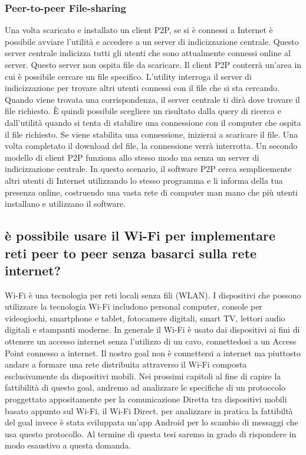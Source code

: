 \subsubsection{Peer-to-peer File-sharing}
Una volta scaricato e installato un client P2P, se si è connessi a Internet è
possibile avviare l'utilità e accedere a un server di indicizzazione centrale.
Questo server centrale indicizza tutti gli utenti che sono attualmente connessi
online al server. Questo server non ospita file da scaricare. Il client P2P
conterrà un'area in cui è possibile cercare un file specifico. L'utility
interroga il server di indicizzazione per trovare altri utenti connessi con il
file che si sta cercando. Quando viene trovata una corrispondenza, il server
centrale ti dirà dove trovare il file richiesto. È quindi possibile scegliere
un risultato dalla query di ricerca e dall'utilità quando si tenta di stabilire
una connessione con il computer che ospita il file richiesto. Se viene
stabilita una connessione, inizierai a scaricare il file. Una volta completato
il download del file, la connessione verrà interrotta.
Un secondo modello di client P2P funziona allo stesso modo ma senza un server
di indicizzazione centrale. In questo scenario, il software P2P cerca
semplicemente altri utenti di Internet utilizzando lo stesso programma e li
informa della tua presenza online, costruendo una vasta rete di computer man
mano che più utenti installano e utilizzano il software.

\subsection{è possibile usare il Wi-Fi per 
implementare reti peer to peer senza basarci sulla rete internet?}

Wi-Fi  è una tecnologia per reti locali senza
fili (WLAN). 
I dispositivi che possono utilizzare la tecnologia Wi-Fi includono 
personal computer, console per videogiochi, smartphone e tablet,
fotocamere digitali, smart TV, lettori audio digitali e stampanti moderne.
In generale il Wi-Fi è usato dai dispositivi 
ai fini di ottenere un accesso internet senza l'utilizzo di un cavo,
connettedosi a un Access Point connesso a internet.
Il nostro goal non è connettersi a internet ma piuttosto andare
a formare una rete distribuita attraverso il Wi-Fi 
composta esclusivamente da dispositivi mobili.
Nei prossimi capitoli al fine di capire la fattibilità
di questo goal,
andremo ad analizzare le specifiche di un protoccolo
proggettato appositamente per la comunicazione Diretta 
tra dispositivi mobili basato appunto sul Wi-Fi, il Wi-Fi Direct.
per analizzare in pratica 
la fattibiltà del goal invece è stata sviluppata un'app Android per 
lo scambio di messaggi che usa questo protocollo.
Al termine di questa tesi saremo in
grado di rispondere in modo esaustivo a questa domanda.





